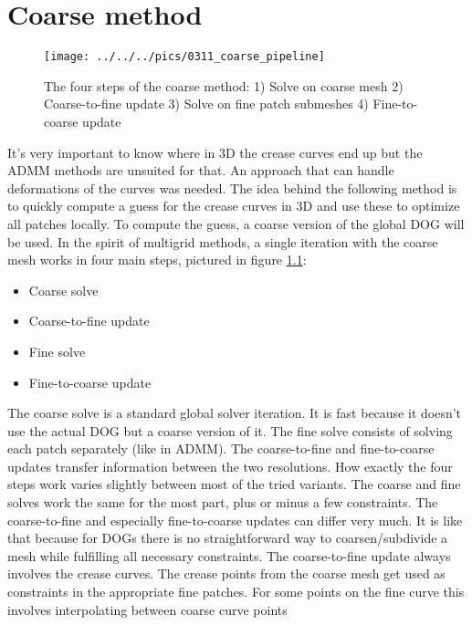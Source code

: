 \documentclass[a4paper,twoside,12pt,nochapterprefix]{scrbook}
\begin{document}
\chapter{Coarse method}\label{sec:coarse}
\begin{figure}
    \centering
    \texttt{[image: ../../../pics/0311\_coarse\_pipeline]}
    \caption{The four steps of the coarse method: 1) Solve on coarse mesh 2) Coarse-to-fine update 3) Solve on fine patch submeshes 4) Fine-to-coarse update}
     \label{fig:coarse_method}
\end{figure}
It's very important to know where in 3D the crease curves end up but the ADMM methods are unsuited for that. An approach that can handle deformations of the curves was needed.\newline
The idea behind the following method is to quickly compute a guess for the crease curves in 3D and use these to optimize all patches locally. To compute the guess, a coarse version of the global DOG will be used.\newline
In the spirit of multigrid methods, a single iteration with the coarse mesh works in four main steps, pictured in figure \ref{fig:coarse_method}:\newline%
\begin{itemize}
\item Coarse solve
\item Coarse-to-fine update
\item Fine solve
\item Fine-to-coarse update
\end{itemize}
The coarse solve is a standard global solver iteration. It is fast because it doesn't use the actual DOG but a coarse version of it. The fine solve consists of solving each patch separately (like in ADMM). The coarse-to-fine and fine-to-coarse updates transfer information between the two resolutions.\newline
How exactly the four steps work varies slightly between most of the tried variants. The coarse and fine solves work the same for the most part, plus or minus a few constraints. The coarse-to-fine and especially fine-to-coarse updates can differ very much. It is like that because for DOGs there is no straightforward way to coarsen/subdivide a mesh while fulfilling all necessary constraints.\newline
The coarse-to-fine update always involves the crease curves. The crease points from the coarse mesh get used as constraints in the appropriate fine patches. For some points on the fine curve this involves interpolating between coarse curve points
\end{document}
